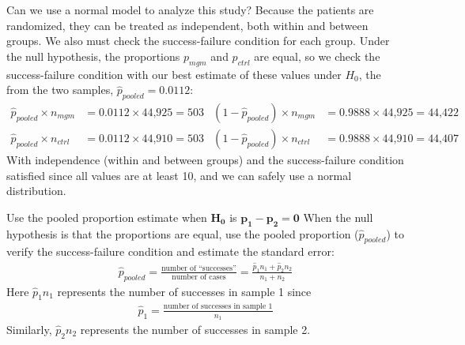 \begin{examplewrap}
\begin{nexample}{Can we use a normal model to analyze this study?}
  \label{condFormammogramStudySummaryTableNormalInference}%
  Because the patients are randomized, they can be treated
  as independent, both within and between groups.
  We also must check the success-failure condition for each group.
  Under the null hypothesis, the proportions $p_{mgm}$
  and $p_{ctrl}$ are equal, so we check the success-failure
  condition with our best estimate of these values under $H_0$,
  the  from the two samples,
  $\hat{p}_{\textit{pooled}} = 0.0112$:
  \begin{align*}
  \hat{p}_{\textit{pooled}} \times n_{mgm}
      &= 0.0112 \times \text{44,925} = 503
    & (1 - \hat{p}_{\textit{pooled}}) \times n_{mgm}
      &= 0.9888 \times \text{44,925} = \text{44,422} \\
  \hat{p}_{\textit{pooled}} \times n_{ctrl}
      &= 0.0112 \times \text{44,910} = 503
    & (1 - \hat{p}_{\textit{pooled}}) \times n_{ctrl}
      &= 0.9888 \times \text{44,910} = \text{44,407}
  \end{align*}
  With independence (within and between groups) and
  the success-failure condition satisfied since all values
  are at least 10, and we can safely use a normal distribution.
\end{nexample}
\end{examplewrap}

\begin{onebox}{Use the pooled proportion estimate when
    $\mathbf{H_0}$ is $\mathbf{p_1 - p_2 = 0}$}
  When the null hypothesis is that the proportions are equal,
  use the pooled proportion ($\hat{p}_{\textit{pooled}}$)
  to verify the
  success-failure condition and estimate the standard error:
  \begin{eqnarray*}
  \hat{p}_{\textit{pooled}}
    = \frac{\text{number of ``successes''}}
      {\text{number of cases}}
    = \frac{\hat{p}_1 n_1 + \hat{p}_2 n_2}{n_1 + n_2}
  \end{eqnarray*}
  Here $\hat{p}_1 n_1$ represents the number of successes in
  sample 1 since
  \begin{eqnarray*}
  \hat{p}_1
    = \frac{\text{number of successes in sample 1}}{n_1}
  \end{eqnarray*}
  Similarly, $\hat{p}_2 n_2$ represents the number of successes
  in sample 2.
\end{onebox}

